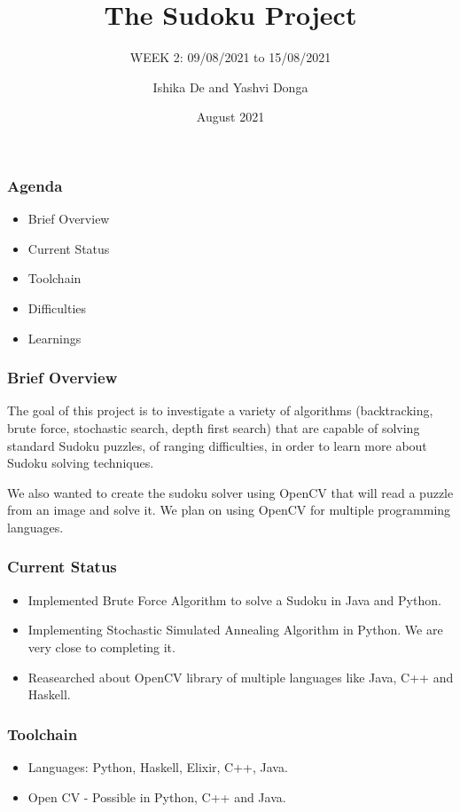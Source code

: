 \documentclass{beamer}
\title{The Sudoku Project}
\subtitle{WEEK 2: 09/08/2021 to 15/08/2021}
\author[Ishika | Yashvi]{Ishika De and Yashvi Donga}
\date{August 2021}
\begin{document}
\begin{frame}
     \titlepage
\end{frame}
\begin{frame}
     \frametitle{Agenda}
     \begin{itemize}
          \item Brief Overview
          \item Current Status
          \item Toolchain
          \item Difficulties
          \item Learnings
     \end{itemize}
\end{frame}

\begin{frame}
     \frametitle{Brief Overview}
     The goal of this project is to investigate a variety of algorithms (backtracking, brute force, stochastic search, depth first search) that are capable of solving
standard Sudoku puzzles, of ranging difficulties, in order to learn more about Sudoku
solving techniques.\newline

     We also wanted to create the sudoku solver using OpenCV that will read a puzzle from an image and solve it. We plan on using OpenCV for multiple programming languages.
\end{frame}

\begin{frame}
     \frametitle{Current Status}   
     \begin{itemize}
		  \item Implemented Brute Force Algorithm to solve a Sudoku in Java and Python.
 		  \item Implementing Stochastic Simulated Annealing Algorithm in Python. We are very close to completing it.
		  \item Reasearched about OpenCV library of multiple languages like Java, C++ and Haskell.
	 \end{itemize}
\end{frame}


\begin{frame}
     \frametitle{Toolchain}
     \begin{itemize}
          \item Languages: Python, Haskell, Elixir, C++, Java.
          \item Open CV - Possible in Python, C++ and Java.
     \end{itemize}
\end{frame}
\end{document}
